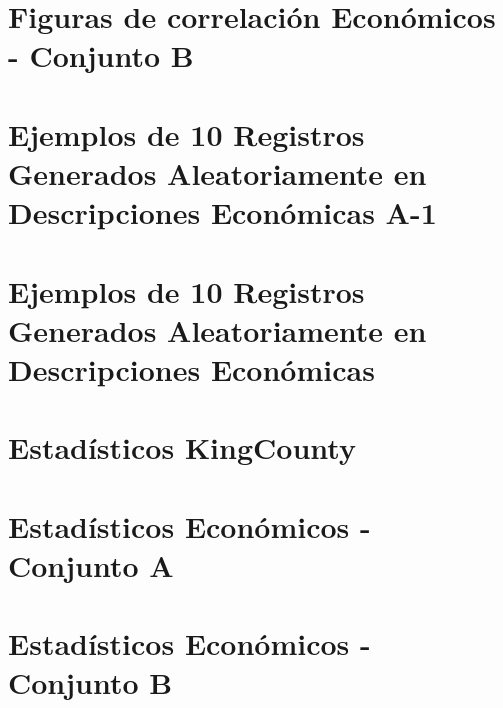 \section{Figuras de correlación Económicos - Conjunto B}
\label{pairwise-full-a}


%

\section{Ejemplos de 10 Registros Generados Aleatoriamente en Descripciones Económicas A-1}
\label{ejemplo-10-aleatoreos-a}


\section{Ejemplos de 10 Registros Generados Aleatoriamente en Descripciones Económicas}
\label{ejemplo-10-aleatoreos-b}


\section{Estadísticos KingCounty}
\label{propiedades-estadisticas-kingCounty}


\section{Estadísticos Económicos - Conjunto A}
\label{propiedades-estadisticas-economicos-A}



\section{Estadísticos Económicos - Conjunto B}
\label{propiedades-estadisticas-economicos-B}

